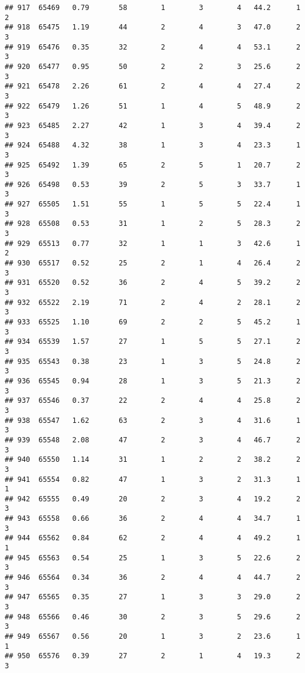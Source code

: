 \documentclass[
]{article}
\begin{document}
\begin{verbatim}
## 917  65469   0.79       58        1        3        4   44.2      1      2
## 918  65475   1.19       44        2        4        3   47.0      2      3
## 919  65476   0.35       32        2        4        4   53.1      2      3
## 920  65477   0.95       50        2        2        3   25.6      2      3
## 921  65478   2.26       61        2        4        4   27.4      2      3
## 922  65479   1.26       51        1        4        5   48.9      2      3
## 923  65485   2.27       42        1        3        4   39.4      2      3
## 924  65488   4.32       38        1        3        4   23.3      1      3
## 925  65492   1.39       65        2        5        1   20.7      2      3
## 926  65498   0.53       39        2        5        3   33.7      1      3
## 927  65505   1.51       55        1        5        5   22.4      1      3
## 928  65508   0.53       31        1        2        5   28.3      2      3
## 929  65513   0.77       32        1        1        3   42.6      1      2
## 930  65517   0.52       25        2        1        4   26.4      2      3
## 931  65520   0.52       36        2        4        5   39.2      2      3
## 932  65522   2.19       71        2        4        2   28.1      2      3
## 933  65525   1.10       69        2        2        5   45.2      1      3
## 934  65539   1.57       27        1        5        5   27.1      2      3
## 935  65543   0.38       23        1        3        5   24.8      2      3
## 936  65545   0.94       28        1        3        5   21.3      2      3
## 937  65546   0.37       22        2        4        4   25.8      2      3
## 938  65547   1.62       63        2        3        4   31.6      1      3
## 939  65548   2.08       47        2        3        4   46.7      2      3
## 940  65550   1.14       31        1        2        2   38.2      2      3
## 941  65554   0.82       47        1        3        2   31.3      1      1
## 942  65555   0.49       20        2        3        4   19.2      2      3
## 943  65558   0.66       36        2        4        4   34.7      1      3
## 944  65562   0.84       62        2        4        4   49.2      1      1
## 945  65563   0.54       25        1        3        5   22.6      2      3
## 946  65564   0.34       36        2        4        4   44.7      2      3
## 947  65565   0.35       27        1        3        3   29.0      2      3
## 948  65566   0.46       30        2        3        5   29.6      2      3
## 949  65567   0.56       20        1        3        2   23.6      1      1
## 950  65576   0.39       27        2        1        4   19.3      2      3

\end{verbatim}
\end{document}

